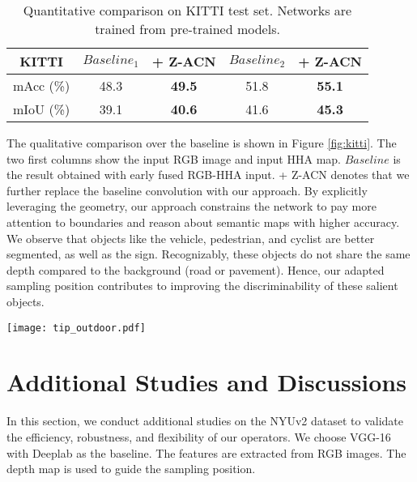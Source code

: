 \documentclass[lettersize,journal]{IEEEtran}
\begin{document}
\begin{table}[t]
\centering
\caption{Quantitative comparison on KITTI test set. Networks are trained from pre-trained models.}
\begin{tabular}[ht]{ c c c | c c}
\hline
KITTI & $Baseline_1$ &  + Z-ACN & $Baseline_2$   & \textbf{+ Z-ACN} \\
\hline
mAcc (\%)&  48.3 & \textbf{49.5} & 51.8   & \textbf{55.1}\\
mIoU (\%)&  39.1 & \textbf{40.6} & 41.6   & \textbf{45.3} \\
\hline
\end{tabular}

\label{prekitti}
\end{table}

The qualitative comparison over the baseline is shown in Figure \ref{fig:kitti}. The two first columns show the input RGB image and input HHA map. $Baseline$ is the result obtained with early fused RGB-HHA input. + Z-ACN denotes that we further replace the baseline convolution with our approach. By explicitly leveraging the geometry, our approach constrains the network to pay more attention to boundaries and reason about semantic maps with higher accuracy. We observe that objects like the vehicle, pedestrian, and cyclist are better segmented, as well as the sign. Recognizably, these objects do not share the same depth compared to the background (road or pavement). Hence, our adapted sampling position contributes to improving the discriminability of these salient objects.


\begin{figure*}
\centering
\texttt{[image: tip\_outdoor.pdf]} 
\caption{On the left we illustrate the qualitative comparison on the NYUv2 dataset. The two first columns are the input RGB and HHA, respectively. $Baseline$ represents the semantic map obtained with early fused RGB-HHA input. + Z-ACN stands for the results obtained by inserting our depth-adapted sampling position into the baseline. It can be seen that our approach can also improve the baseline performance in outdoor scenes. The black regions in "GT" are the ignoring category. On the right, we illustrate the per-class improvement above the baseline. We improve 7/11 objects with 3.7\% mean IoU increment. Segmentation results on the KITTI test dataset. GT stands for ground truth. The black regions in "GT" are the ignoring category.}
\label{fig:kitti}
\end{figure*}


\section{Additional Studies and Discussions}
\label{study}
In this section, we conduct additional studies on the NYUv2 dataset to validate the efficiency, robustness, and flexibility of our operators. We choose VGG-16 with Deeplab as the baseline. The features are extracted from RGB images. The depth map is used to guide the sampling position. 
\end{document}
